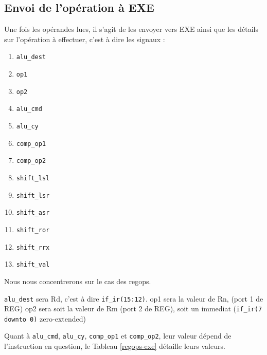 \documentclass{article}
\begin{document}


\subsection{Envoi de l'opération à EXE}

Une fois les opérandes lues, il s'agit de les envoyer vers EXE ainsi que les détails
sur l'opération à effectuer, c'est à dire les signaux :
\begin{enumerate}
  \item \texttt{alu\_dest}
  \item \texttt{op1}
  \item \texttt{op2}
  \item \texttt{alu\_cmd}
  \item \texttt{alu\_cy}
  \item \texttt{comp\_op1}
  \item \texttt{comp\_op2}
  \item \texttt{shift\_lsl}
  \item \texttt{shift\_lsr}
  \item \texttt{shift\_asr}
  \item \texttt{shift\_ror}
  \item \texttt{shift\_rrx}
  \item \texttt{shift\_val}
\end{enumerate}

Nous nous concentrerons sur le cas des regops.

\texttt{alu\_dest} sera Rd, c'est à dire \texttt{if\_ir(15:12)}.
op1 sera la valeur de Rn, (port 1 de REG)
op2 sera soit la valeur de Rm (port 2 de REG), soit un immediat (\texttt{if\_ir(7 downto 0)} zero-extended)

Quant à \texttt{alu\_cmd}, \texttt{alu\_cy}, \texttt{comp\_op1} et \texttt{comp\_op2},
leur valeur dépend de l'instruction en question,
le Tableau \ref{regops-exe} détaille leurs valeurs.
\end{document}
